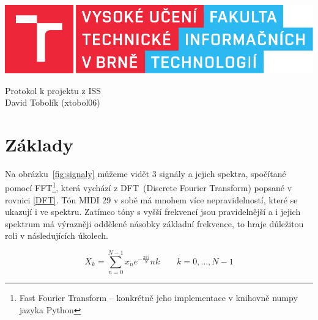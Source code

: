 \documentclass[a4paper, 12pt]{article}
\begin{document}
	
	\begin{titlepage}
		\centering
		
		\includegraphics{src/fitlogo.pdf}
		
		
		{\Huge Protokol k projektu z ISS\\[0.4em]
			\LARGE David Tobolík (xtobol06)}
		
	\end{titlepage}
	
	\tableofcontents
	\newpage
	
	\section{Základy}
	Na obrázku~\ref{fig:signaly} můžeme vidět 3 signály a jejich spektra, spočítané pomocí FFT\footnote{Fast Fourier Transform -- konkrétně jeho implementace v knihovně numpy\cite{np} jazyka Python}, která vychází z DFT~(Discrete Fourier Transform) \cite{DFT} popsané v rovnici \eqref{DFT}. Tón MIDI 29 v sobě má mnohem více nepravidelností, které se ukazují i ve spektru. Zatímco tóny s vyšší frekvencí jsou pravidelnější a i jejich spektrum má výrazněji oddělené násobky základní frekvence, to hraje důležitou roli v následujících úkolech.
	
	\begin{equation}
		X_k = \sum_{n=0}^{N-1} x_n e^{- \frac{2 \pi i}{N}} n k \qquad k = 0, \dots, N-1 \label{DFT}
	\end{equation}
\end{document}

